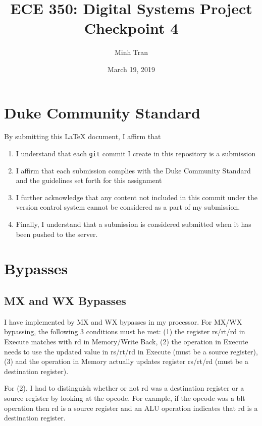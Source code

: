 \documentclass[letterpaper]{article} %
\begin{document}
\title{ECE 350: Digital Systems Project Checkpoint 4}
\author{Minh Tran} %
\date{March 19, 2019} %
\maketitle

\section*{Duke Community Standard}

By submitting this \LaTeX{} document, I affirm that
\begin{enumerate}
    \item I understand that each \texttt{git} commit I create in this repository is a submission
    \item I affirm that each submission complies with the Duke Community Standard and the guidelines set forth for this assignment
    \item I further acknowledge that any content not included in this commit under the version control system cannot be considered as a part of my submission.
    \item Finally, I understand that a submission is considered submitted when it has been pushed to the server.
\end{enumerate}

\newpage

\section{Bypasses}
\subsection{MX and WX Bypasses}
I have implemented by MX and WX bypasses in my processor. For MX/WX bypassing, the following 3 conditions must be met:
(1) the register rs/rt/rd in Execute matches with rd in Memory/Write Back, (2) the operation in Execute needs to use the updated value in rs/rt/rd in Execute (must be a source register), (3) and the operation in Memory actually updates register rs/rt/rd (must be a destination register).

For (2), I had to distinguish whether or not rd was a destination register or a source register by looking at the opcode. For example, if the opcode was a blt operation then rd is a source register and an ALU operation indicates that rd is a destination register. 
\end{document}
